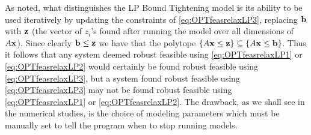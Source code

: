 As noted, what distinguishes the LP Bound Tightening model is its ability to be used iteratively by updating the constraints of \cref{eq:OPTfeasrelaxLP3}, replacing $\mathbf{b}$ with $\mathbf{z}$ (the vector of $z_i$'s found after running the model over all dimensions of $A\mathbf{x}$). 
Since clearly $\mathbf{b}\leq \mathbf{z}$ we have that the polytope $\{A\mathbf{x}\leq \mathbf{z}\}\subseteq\{A\mathbf{x}\leq \mathbf{b}\}$. 
Thus it follows that any system deemed robust feasible using \cref{eq:OPTfeasrelaxLP1} or \cref{eq:OPTfeasrelaxLP2} would certainly be found robust feasible using \cref{eq:OPTfeasrelaxLP3}, but a system found robust feasible using \cref{eq:OPTfeasrelaxLP3} may not be found robust feasible using \cref{eq:OPTfeasrelaxLP1} or \cref{eq:OPTfeasrelaxLP2}. 
The drawback, as we shall see in the numerical studies, is the choice of modeling parameters which must be manually set to tell the program when to stop running models. 

